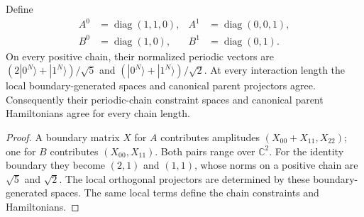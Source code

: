 \begin{lemma}
    \label{thm:ldp_sector_weight_parent}
    \leanok
    Define
    \begin{align}
        A^0 & =\operatorname{diag}(1,1,0), & A^1 & =\operatorname{diag}(0,0,1), \\
        B^0 & =\operatorname{diag}(1,0),   & B^1 & =\operatorname{diag}(0,1).
    \end{align}
    On every positive chain, their normalized periodic vectors are
    $(2|0^N\rangle+|1^N\rangle)/\sqrt5$ and
    $(|0^N\rangle+|1^N\rangle)/\sqrt2$.
    At every interaction length the local boundary-generated spaces and
    canonical parent projectors agree. Consequently their periodic-chain
    constraint spaces and canonical parent Hamiltonians agree for every
    chain length.
\end{lemma}
\begin{proof}
    \leanok
    A boundary matrix $X$ for $A$ contributes amplitudes
    $(X_{00}+X_{11},X_{22})$; one for $B$ contributes $(X_{00},X_{11})$.
    Both pairs range over $\mathbb C^2$. For the identity boundary they
    become $(2,1)$ and $(1,1)$, whose norms on a positive chain are
    $\sqrt5$ and $\sqrt2$. The local orthogonal projectors are determined
    by these boundary-generated spaces. The same local terms define the
    chain constraints and Hamiltonians.
\end{proof}

